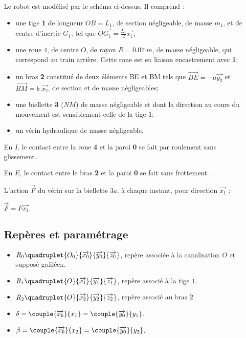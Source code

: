 \begin{multicols}{2}
Le robot est modélisé par le schéma ci-dessus. Il comprend :
\begin{itemize}
\item une tige \textbf{1} de longueur $OB=L_1$, de section négligeable, de masse $m_1$, et de centre d'inertie $G_1$, tel que $\overrightarrow{OG_1}=\frac{L_1}{2}\overrightarrow{x_1}$;
\item une roue $4$, de centre $O$, de rayon $R = \SI{0,07}{m}$, de masse négligeable, qui
correspond au train arrière. Cette roue est en liaison encastrement avec \textbf{1};
\item un bras \textbf{2} constitué de deux éléments BE et BM tels que $\overrightarrow{BE}=-a\overrightarrow{y_2}$ et $\overrightarrow{BM}=b\;\overrightarrow{x_2}$, de section et de masse négligeables;
\item une biellette \textbf{3} ($NM$) de masse négligeable et dont la direction au cours
du mouvement est sensiblement celle de la tige $1$;
\item un vérin hydraulique de masse négligeable.
\end{itemize}

 En $I$, le contact entre la roue \textbf{4} et la paroi \textbf{0} se fait par roulement sans glissement.

 En $E$, le contact entre le bras \textbf{2} et la paroi \textbf{0} se fait sans frottement.

 L'action $\overrightarrow{F}$ du vérin sur la biellette $3a$, à chaque instant, pour direction $\overrightarrow{x_1}$ :

$\overrightarrow{F} = F \overrightarrow{x_1}.$

\fi

\subsection*{Repères et paramétrage}
\ifprof
\else

\begin{itemize}
\item $R_0\quadruplet{O_0}{\overrightarrow{x_0}}{\overrightarrow{y_0}}{\overrightarrow{z_0}}$, repère associée à la canalisation $O$ et supposé galiléen.
\item $R_1\quadruplet{O}{\overrightarrow{x_1}}{\overrightarrow{y_1}}{\overrightarrow{z_1}}$, repère associé à la tige $1$.
\item $R_2\quadruplet{O}{\overrightarrow{x_2}}{\overrightarrow{y_2}}{\overrightarrow{z_2}}$, repère associé au bras $2$.
\item $\delta=\couple{\overrightarrow{x_0}}{{x_1}}=\couple{\overrightarrow{y_0}}{{y_1}}$.
\item $\beta=\couple{\overrightarrow{x_0}}{{x_2}}=\couple{\overrightarrow{y_0}}{{y_2}}$.
\end{itemize}


\end{multicols}
